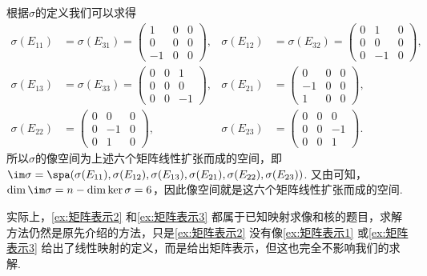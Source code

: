 \begin{solution}
    根据$\sigma$的定义我们可以求得
    \begin{align*}
        \sigma(E_{11})&=\sigma(E_{31})=\begin{pmatrix}
            1 & 0 & 0 \\ 0 & 0 & 0 \\ -1 & 0 & 0
        \end{pmatrix}, &
        \sigma(E_{12})&=\sigma(E_{32})=\begin{pmatrix}
            0 & 1 & 0 \\ 0 & 0 & 0 \\ 0 & -1 & 0
        \end{pmatrix}, \\
        \sigma(E_{13})&=\sigma(E_{33})=\begin{pmatrix}
            0 & 0 & 1 \\ 0 & 0 & 0 \\ 0 & 0 & -1
        \end{pmatrix}, &
        \sigma(E_{21})&=\begin{pmatrix}
            0 & 0 & 0 \\ -1 & 0 & 0 \\ 1 & 0 & 0
        \end{pmatrix}, \\
        \sigma(E_{22})&=\begin{pmatrix}
            0 & 0 & 0 \\ 0 & -1 & 0 \\ 0 & 1 & 0
        \end{pmatrix}, &
        \sigma(E_{23})&=\begin{pmatrix}
            0 & 0 & 0 \\ 0 & 0 & -1 \\ 0 & 0 & 1
        \end{pmatrix}.
    \end{align*}
    所以$\sigma$的像空间为上述六个矩阵线性扩张而成的空间，即$\im\sigma=\spa(\sigma(E_{11}),\sigma(E_{12}),\sigma(E_{13}),\sigma(E_{21}),\sigma(E_{22}),\sigma(E_{23}))$. 又由可知，$\dim\im\sigma=n-\dim\ker\sigma=6$，因此像空间就是这六个矩阵线性扩张而成的空间.
\end{solution}

实际上，\autoref{ex:矩阵表示2} 和\autoref{ex:矩阵表示3} 都属于已知映射求像和核的题目，求解方法仍然是原先介绍的方法，只是\autoref*{ex:矩阵表示2} 没有像\autoref{ex:矩阵表示1} 或\autoref*{ex:矩阵表示3} 给出了线性映射的定义，而是给出矩阵表示，但这也完全不影响我们的求解.

